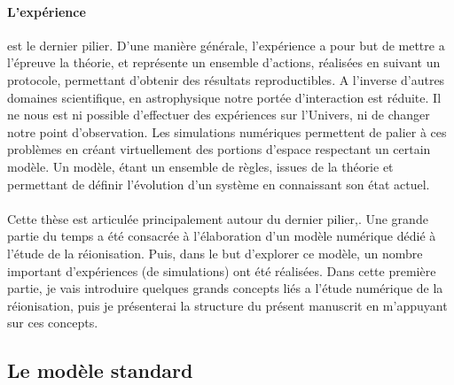 \paragraph{L'expérience} est le dernier pilier.
D'une manière générale, l'expérience a pour but de mettre a l’épreuve la théorie, et représente un ensemble d'actions, réalisées en suivant un protocole, permettant d'obtenir des résultats reproductibles.
A l'inverse d'autres domaines scientifique, en astrophysique notre portée d'interaction est réduite.
Il ne nous est ni possible d'effectuer des expériences sur l'Univers, ni de changer notre point d'observation.
Les simulations numériques permettent de palier à ces problèmes en créant virtuellement des portions d'espace respectant un certain modèle.
Un modèle, étant un ensemble de règles, issues de la théorie et permettant de définir l'évolution d'un système en connaissant son état actuel.


\paragraph{}

Cette thèse est articulée principalement autour du dernier pilier,.
Une grande partie du temps a été consacrée à l'élaboration d'un modèle numérique dédié à l'étude de la réionisation.
Puis, dans le but d'explorer ce modèle, un nombre important d'expériences (de simulations) ont été réalisées.
Dans cette première partie, je vais introduire quelques grands concepts liés a l'étude numérique de la réionisation, puis je présenterai la structure du présent manuscrit en m'appuyant sur ces concepts.

\subsection*{Le modèle standard}

